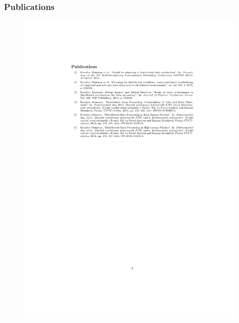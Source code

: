 \documentclass{beamer}
\begin{document}
\begin{frame}\frametitle{Publications}
\begin{figure}
	\begin{center}
		\centering
		\includegraphics[trim = 40mm 0mm 30mm 50mm,clip,width=\textwidth]{myref.pdf}
	\end{center}
\end{figure}	
\end{frame}

\begin{tiny}
\renewcommand*{\bibfont}{\tiny}
\printbibliography[notkeyword=my]
\end{tiny}
\end{document}
